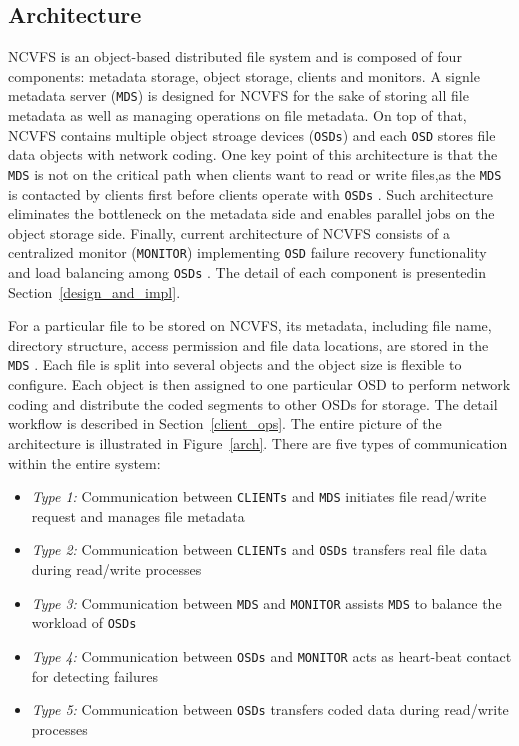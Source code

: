 \documentclass{article}
\def\osd{\texttt{OSD} }
\def\osds{\texttt{OSDs} }
\def\mds{\texttt{MDS} }
\def\clients{\texttt{CLIENTs} }
\def\monitor{\texttt{MONITOR} }
\begin{document}
\subsection{Architecture}
NCVFS is an object-based distributed file system and is composed of four components: metadata storage,
object storage, clients and monitors. A signle metadata server (\texttt{MDS}) is designed for NCVFS for the 
sake of storing all file metadata as well as managing operations on file metadata. On top of that, 
NCVFS contains multiple object stroage devices (\texttt{OSDs}) and each \osd stores file data objects with
network coding. One
key point of this architecture is that the \mds is not on the critical path when clients want to 
read or write files,as the \mds is contacted by clients first before clients operate with \osds. Such
architecture eliminates the bottleneck on the metadata side and enables parallel jobs on the object
storage side. Finally, current architecture of NCVFS consists of a centralized monitor (\texttt{MONITOR})
implementing \osd failure recovery functionality and load balancing among \osds. The detail of each component 
is presentedin Section~\ref{design_and_impl}.

\drawArch

For a particular file to be stored on NCVFS, its metadata, including file
name, directory structure, access permission and file data locations, are stored
in the \mds . Each file is split into several objects and the object size is
flexible to
configure. Each object is then assigned to one particular OSD to perform network
coding and distribute the coded segments to other OSDs for storage. The detail
workflow is described in Section~\ref{client_ops}. The entire picture of the architecture is
illustrated in Figure~\ref{arch}. There are five types of communication within
the entire system:
\begin{itemize}
	\item[] \textit{Type 1:} Communication between \clients and \mds initiates file read/write request and manages file metadata
	\item[] \textit{Type 2:} Communication between \clients and \osds transfers real file data during read/write processes
	\item[] \textit{Type 3:} Communication between \mds and \monitor assists \mds to balance the workload of \osds
	\item[] \textit{Type 4:} Communication between \osds and \monitor acts as heart-beat contact for detecting failures
	\item[] \textit{Type 5:} Communication between \osds transfers coded data during read/write processes
\end{itemize}
\end{document}
